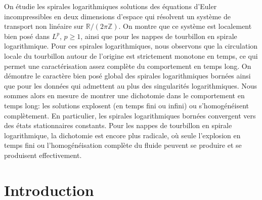 \documentclass[JEP,XML,SOM,Unicode,NoFloatCountersInSection,published]{cedram}
\theoremstyle{plain}
\theoremstyle{definition}
\begin{document}

\begin{altabstract}
On étudie les spirales logarithmiques solutions des équations d'Euler incompressibles en deux dimensions d'espace qui résolvent un système de transport non linéaire sur $\mathbb R/(2\pi\mathbb Z)$. On montre que ce système est localement bien posé dans $L^p$, $p\geq 1$, ainsi que pour les nappes de tourbillon en spirale logarithmique. Pour ces spirales logarithmiques, nous observons que la circulation locale du tourbillon autour de l'origine est strictement monotone en temps, ce qui permet une caractérisation assez complète du comportement en temps long. On démontre le caractère bien posé global des spirales logarithmiques bornées ainsi que pour les données qui admettent au plus des singularités logarithmiques. Nous sommes alors en mesure de montrer une dichotomie dans le comportement en temps long: les solutions explosent (en temps fini ou infini) ou s'homogénéisent complètement. En particulier, les spirales logarithmiques bornées convergent vers des états stationnaires constants. Pour les nappes de tourbillon en spirale logarithmique, la dichotomie est encore plus radicale, où seule l'explosion en temps fini ou l'homogénéisation complète du fluide peuvent se produire et se produisent effectivement.
\end{altabstract}

\maketitle
\vspace*{-.1\baselineskip}
\tableofcontents


\section{Introduction}
\end{document}
